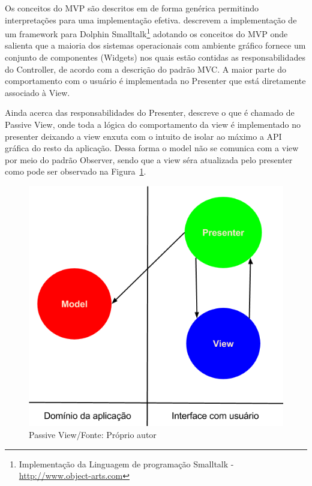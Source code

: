 Os conceitos do MVP são descritos em  de forma genérica
permitindo interpretações para uma implementação efetiva.
 descrevem a implementação de um framework para
Dolphin Smalltalk\footnote{Implementação da Linguagem de programação Smalltalk - 
\url{http://www.object-arts.com}} adotando os conceitos do MVP onde salienta que
a maioria dos sistemas operacionais com ambiente gráfico fornece um conjunto de
componentes (Widgets) nos quais estão contidas as responsabilidades do
Controller, de acordo com a descrição do padrão MVC. A maior parte do
comportamento com o usuário é implementada no Presenter que está
diretamente associado à View.

Ainda acerca das responsabilidades do Presenter,  descreve
o que é chamado de Passive View, onde toda a lógica do comportamento da view é
implementado no presenter deixando a view enxuta com o intuito de isolar ao
máximo a API gráfica do resto da aplicação. Dessa forma o model não se comunica
com a view por meio do padrão Observer, sendo que a view séra atualizada
pelo presenter como pode ser observado na Figura~\ref{fig:mvp_passive_view}.

\begin{figure}[ht]
	\centering
	\includegraphics[scale=0.5]{img/passive_view.png}
	\caption{Passive View/Fonte: Próprio autor}
	\label{fig:mvp_passive_view}
\end{figure}

